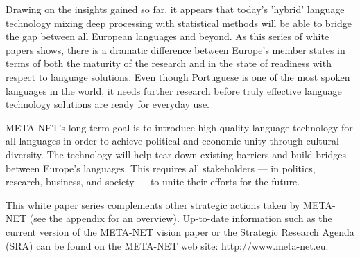 \begin{multicols}{2}

   Drawing on the insights gained so far, it appears that today’s 'hybrid' language technology mixing deep processing with statistical methods will be able to bridge the gap between all European languages and beyond. As this series of white papers shows, there is a dramatic difference between Europe’s member states in terms of both the maturity of the research and in the state of readiness with respect to language solutions. Even though Portuguese is one of the most spoken languages in the world, it needs further research before truly effective language technology solutions are ready for everyday use. 

    META-NET’s long-term goal is to introduce high-quality language technology for all languages in order to achieve political and economic unity through cultural diversity. The technology will help tear down existing barriers and build bridges between Europe’s languages. This requires all stakeholders — in politics, research, business, and society — to unite their efforts for the future.

    This white paper series complements other strategic actions taken by META-NET (see the appendix for an overview). Up-to-date information such as the current version of the META-NET vision paper\cite{Meta1} or the Strategic Research Agenda (SRA) can be found on the META-NET web site: http://www.meta-net.eu.
\end{multicols}

\clearpage


